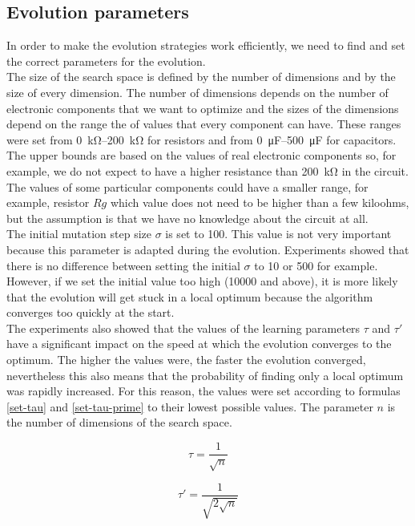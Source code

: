\subsection{Evolution parameters}
In order to make the evolution strategies work efficiently, we need to find and set the correct parameters for the evolution.\\
The size of the search space is defined by the number of dimensions and by the size of every dimension. The number of dimensions depends on the number of electronic components that we want to optimize and the sizes of the dimensions depend on the range the of values that every component can have. These ranges were set from \SIrange{0}{200}{\kilo\ohm} for resistors and from \SIrange{0}{500}{\micro\farad} for capacitors. The upper bounds are based on the values of real electronic components so, for example, we do not expect to have a higher resistance than \SI{200}{\kilo\ohm} in the circuit. The values of some particular components could have a smaller range, for example, resistor $Rg$ which value does not need to be higher than a few kiloohms, but the assumption is that we have no knowledge about the circuit at all.\\
The initial mutation step size $\sigma$ is set to 100. This value is not very important because this parameter is adapted during the evolution. Experiments showed that there is no difference between setting the initial $\sigma$ to 10 or 500 for example. However, if we set the initial value too high (10000 and above), it is more likely that the evolution will get stuck in a local optimum because the algorithm converges too quickly at the start.\\
The experiments also showed that the values of the learning parameters $\tau$ and $\tau'$ have a significant impact on the speed at which the evolution converges to the optimum. The higher the values were, the faster the evolution converged, nevertheless this also means that the probability of finding only a local optimum was rapidly increased. For this reason, the values were set according to formulas \ref{set-tau} and \ref{set-tau-prime} to their lowest possible values. The parameter $n$ is the number of dimensions of the search space.

\begin{equation} \label{set-tau}
    \tau = \frac{1}{\sqrt{n}}
\end{equation}

\begin{equation} \label{set-tau-prime}
    \tau' = \frac{1}{\sqrt{2\sqrt{n}}}
\end{equation}

